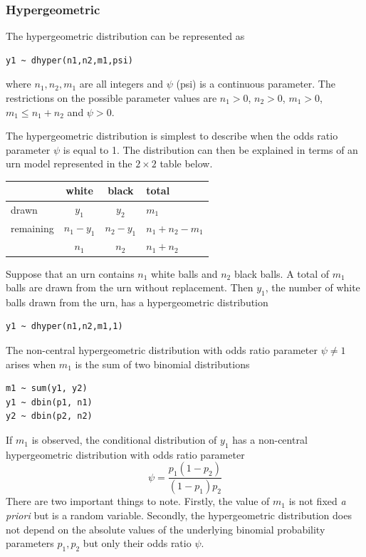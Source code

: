 \documentclass[11pt, a4paper, titlepage]{report}
\begin{document}
{\subsubsection{Hypergeometric}
\label{bugs:dhyper}

The hypergeometric distribution can be represented as
\begin{verbatim}
y1 ~ dhyper(n1,n2,m1,psi)
\end{verbatim}
where $n_1, n_2, m_1$ are all integers and $\psi$ (psi) is a continuous
parameter. The restrictions on the possible parameter values are
$n_1 > 0$, $n_2 > 0$, $m_1 > 0$, $m_1 \leq n_1 + n_2$ and $\psi > 0$.

The hypergeometric distribution is simplest to describe when the odds
ratio parameter $\psi$ is equal to 1. The distribution can then be
explained in terms of an urn model represented in the $2 \times 2$
table below.

\begin{center}
\begin{tabular}{l|cc|l}
   & white & black & total \\
  \hline
  drawn    & $y_1$ & $y_2$ & $m_1$ \\
  remaining & $n_1 - y_1$  & $n_2 - y_1$  & $n_1 + n_2 - m_1$ \\
  \hline
  & $n_1$ & $n_2$ & $n_1 + n_2$ \\
\end{tabular}
\end{center}
  
Suppose that an urn contains $n_1$ white balls and $n_2$ black balls.
A total of $m_1$ balls are drawn from the urn without replacement.
Then $y_1$, the number of white balls drawn from the urn, has a
hypergeometric distribution
\begin{verbatim}
y1 ~ dhyper(n1,n2,m1,1)
\end{verbatim}

The non-central hypergeometric distribution with odds ratio parameter
$\psi \neq 1$ arises when $m_1$ is the sum of two binomial distributions
\begin{verbatim}
m1 ~ sum(y1, y2)
y1 ~ dbin(p1, n1)
y2 ~ dbin(p2, n2)
\end{verbatim}
If $m_1$ is observed, the conditional distribution of $y_1$ has a
non-central hypergeometric distribution with odds ratio parameter
\[
\psi = \frac{p_1 (1 - p_2)}{(1 - p_1) p_2}
\]
There are two important things to note. Firstly, the value of $m_1$ is
not fixed {\em a priori} but is a random variable. Secondly, the
hypergeometric distribution does not depend on the absolute values of
the underlying binomial probability parameters $p_1, p_2$ but only
their odds ratio $\psi$.

}
\end{document}

